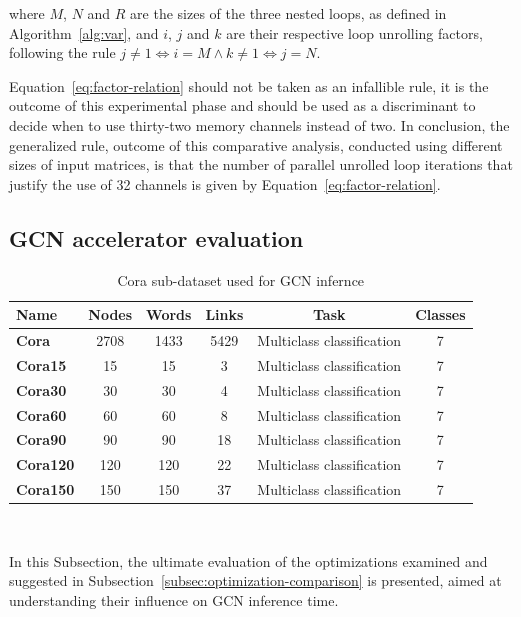 where $M$, $N$ and $R$ are the sizes of the three nested loops, as defined in Algorithm~\ref{alg:var}, and $i$, $j$ and $k$ are their respective loop unrolling factors, following the rule $j \neq 1 \iff i=M \land k \neq 1 \iff j=N$.

Equation~\ref{eq:factor-relation} should not be taken as an infallible rule, it is the outcome of this experimental phase and should be used as a discriminant to decide when to use thirty-two memory channels instead of two.
In conclusion, the generalized rule, outcome of this comparative analysis, conducted using different sizes of input matrices, is that the number of parallel unrolled loop iterations that justify the use of 32 channels is given by Equation~\ref{eq:factor-relation}.

\subsection{GCN accelerator evaluation}
\label{subsec:gcn_accelerator_evaluation}%

\begin{table}[t]
\centering
    \begin{tabular}{|p{4em} c c c c c|}
    \hline
    \textbf{Name} & \textbf{Nodes} & \textbf{Words} & \textbf{Links} & \textbf{Task} & \textbf{Classes} \T\B \\
    \hline \hline
    \textbf{Cora} & 2708  & 1433 & 5429 & Multiclass classification & 7 \T\B\\
    \hline
    \textbf{Cora15} & 15  & 15 & 3 & Multiclass classification & 7 \T\B\\
    \hline
    \textbf{Cora30} & 30  & 30 & 4 & Multiclass classification & 7 \T\B\\
    \hline
    \textbf{Cora60} & 60  & 60 & 8 & Multiclass classification & 7 \T\B\\
    \hline
    \textbf{Cora90} & 90  & 90 & 18 & Multiclass classification & 7 \T\B\\
    \hline
    \textbf{Cora120} & 120  & 120 & 22 & Multiclass classification & 7 \T\B\\
    \hline
    \textbf{Cora150} & 150  & 150 & 37 & Multiclass classification & 7 \T\B\\
    \hline
    \end{tabular}
    \\[10pt]
    \caption{Cora sub-dataset used for GCN infernce}
    \label{tab:dataset-definition}
\end{table}

In this Subsection, the ultimate evaluation of the optimizations examined and suggested in Subsection~\ref{subsec:optimization-comparison} is presented, aimed at understanding their influence on GCN inference time.

